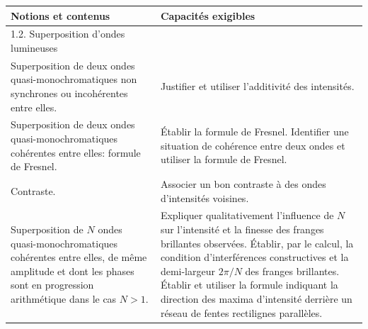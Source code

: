 \begin{tabularx}{\textwidth}{|p{}|X|}
    \hline \textbf{Notions et contenus} & \textbf{Capacités exigibles} \\
        \hline 1.2. Superposition d'ondes lumineuses & \\
        \hline Superposition de deux ondes quasi-monochromatiques non synchrones ou incohérentes entre elles. & Justifier et utiliser l'additivité des intensités. \\
        \hline Superposition de deux ondes quasi-monochromatiques cohérentes entre elles: formule de Fresnel. & Établir la formule de Fresnel. Identifier une situation de cohérence entre deux ondes et utiliser la formule de Fresnel. \\
        \hline Contraste. & Associer un bon contraste à des ondes d'intensités voisines. \\
        \hline Superposition de $N$ ondes quasi-monochromatiques cohérentes entre elles, de même amplitude et dont les phases sont en progression arithmétique dans le cas $N > 1$. & Expliquer qualitativement l'influence de $N$ sur l'intensité et la finesse des franges brillantes observées. Établir, par le calcul, la condition d'interférences constructives et la demi-largeur $2\pi/N$ des franges brillantes. Établir et utiliser la formule indiquant la direction des maxima d'intensité derrière un réseau de fentes rectilignes parallèles. \\
        \hline
\end{tabularx}
